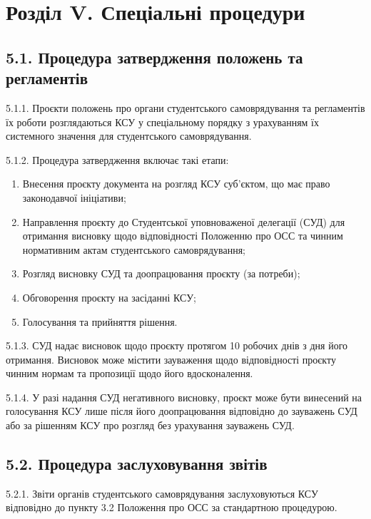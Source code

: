 \section*{Розділ V. Спеціальні процедури}

\subsection*{5.1. Процедура затвердження положень та регламентів}
    5.1.1. Проєкти положень про органи студентського самоврядування та регламентів їх роботи розглядаються КСУ у спеціальному порядку з урахуванням їх системного значення для студентського самоврядування.

    5.1.2. Процедура затвердження включає такі етапи:

        \begin{enumerate}[label=\alph*)]
            \item Внесення проєкту документа на розгляд КСУ суб'єктом, що має право законодавчої ініціативи;
            \item Направлення проєкту до Студентської уповноваженої делегації (СУД) для отримання висновку щодо відповідності Положенню про ОСС та чинним нормативним актам студентського самоврядування;
            \item Розгляд висновку СУД та доопрацювання проєкту (за потреби);
            \item Обговорення проєкту на засіданні КСУ;
            \item Голосування та прийняття рішення.
        \end{enumerate}

    5.1.3. СУД надає висновок щодо проєкту протягом 10 робочих днів з дня його отримання. Висновок може містити зауваження щодо відповідності проєкту чинним нормам та пропозиції щодо його вдосконалення.

    5.1.4. У разі надання СУД негативного висновку, проєкт може бути винесений на голосування КСУ лише після його доопрацювання відповідно до зауважень СУД або за рішенням КСУ про розгляд без урахування зауважень СУД.

\subsection*{5.2. Процедура заслуховування звітів}
    5.2.1. Звіти органів студентського самоврядування заслуховуються КСУ відповідно до пункту 3.2 Положення про ОСС за стандартною процедурою.

